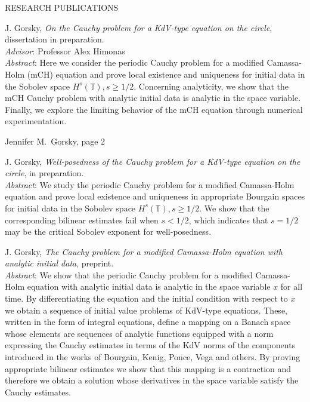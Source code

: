\documentclass[11pt]{article}
\begin{document}
\vspace{0.3in}
{\bld RESEARCH PUBLICATIONS}

\vspace{0.1in}
\parbox[t]{0.5in}{\hspace{1in}}
\parbox[t]{6.5in}
     { J. Gorsky, 
{\em On the Cauchy problem for a KdV-type equation on the
circle}, dissertation in preparation.\\
{\em Advisor}:  Professor Alex Himonas\\ 
{\em Abstract}:  Here we consider the periodic
Cauchy problem for a modified
Camassa-Holm (mCH)
equation and prove local existence and uniqueness for initial data in the
Sobolev space
$H^s(\mathbb{T}), s \ge 1/2$.  
Concerning analyticity, we show that the mCH Cauchy problem with analytic
initial data is analytic in the space variable.  Finally, we explore the
limiting behavior of the mCH equation through numerical experimentation.  
}




 \pagebreak

{\bld Jennifer M.\ Gorsky, page 2}

\vspace{0.3in}




\parbox[t]{0.5in}{\hspace{1in}}
\parbox[t]{6.5in}
     { J. Gorsky, 
{\em Well-posedness of the Cauchy problem for a KdV-type equation on the
circle}, in preparation.\\ 
{\em Abstract}:  We study the periodic Cauchy problem for
a modified Camassa-Holm
equation and prove local existence and uniqueness in appropriate 
Bourgain
spaces for initial data in the Sobolev space
$H^s(\mathbb{T}), s \ge 1/2$.  We show that the corresponding bilinear
estimates fail when $s<1/2$, which indicates that $s=1/2$ may be the
critical Sobolev exponent for well-posedness.      }



\vspace{0.1in}
\parbox[t]{0.5in}{\hspace{1in}}
\parbox[t]{6.5in}
     { J. Gorsky, 
{\em The Cauchy problem for a modified Camassa-Holm equation with analytic
initial data}, preprint.\\  {\em Abstract}:  We show that the periodic Cauchy problem for a modified Camassa-Holm
equation with analytic initial data is analytic in the space variable $x$ for
all time. By differentiating the equation and the initial condition with
respect to $x$ we obtain a sequence of initial value problems of KdV-type
equations. These, written in the form of integral equations, define
a mapping on a Banach  space whose elements are sequences of analytic
functions equipped with a norm  expressing the Cauchy estimates
in terms of the KdV norms of the components introduced in the works
of Bourgain, Kenig, Ponce, Vega and others. By proving appropriate
bilinear estimates we show that this mapping is a contraction and
therefore we obtain a solution whose derivatives in the space variable
satisfy the Cauchy estimates.    }
\end{document}
